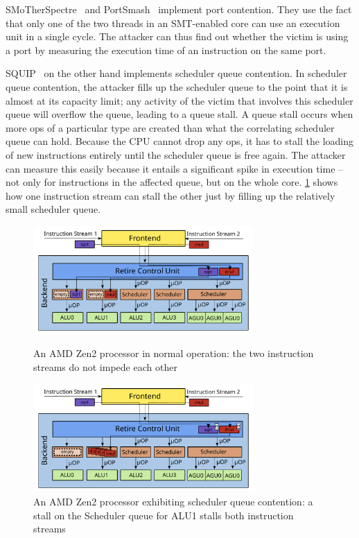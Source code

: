\documentclass[11pt,
  titlepage=false,
]{scrreprt}
\begin{document}
SMoTherSpectre~\cite{Bhattacharyya2019} and PortSmash~\cite{Aldaya2019port} implement port contention.
They use the fact that only one of the two threads in an SMT-enabled core can use an execution unit in a single cycle.
The attacker can thus find out whether the victim is using a port by measuring the execution time of an instruction on the same port.

SQUIP~\cite{squip} on the other hand implements scheduler queue contention.
In scheduler queue contention, the attacker fills up the scheduler queue to the point that it is almost at its capacity limit;
any activity of the victim that involves this scheduler queue will overflow the queue, leading to a queue stall.
A queue stall occurs when more \textmu ops of a particular type are created than what the correlating scheduler queue can hold.
Because the CPU cannot drop any \textmu ops, it has to stall the loading of new instructions entirely until the scheduler queue is free again.
The attacker can measure this easily because it entails a significant spike in execution time --
not only for instructions in the affected queue, but on the whole core.
\ref{fig:amdzen2sqc} shows how one instruction stream can stall the other just by filling up the relatively small scheduler queue.

\begin{figure}
    \centering
    \includegraphics[width=0.75\textwidth]{figures/Zen2 normal operation}

    \caption{An AMD Zen2 processor in normal operation: the two instruction streams do not impede each other}
    \label{fig:amdzen2normaloperation}

    \includegraphics[width=0.75\textwidth]{figures/Zen2 sqc}

    \caption{An AMD Zen2 processor exhibiting scheduler queue contention: a stall on the Scheduler queue for ALU1 stalls both instruction streams}
    \label{fig:amdzen2sqc}
\end{figure}
\end{document}

